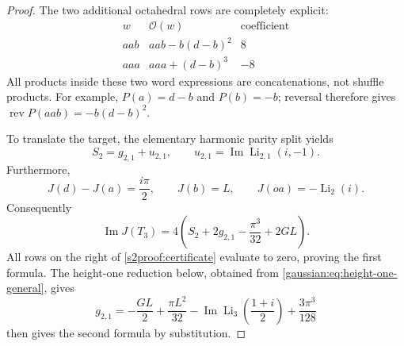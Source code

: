 \begin{proof}
The two additional octahedral rows are completely explicit:
\[
\begin{array}{c|l|r}
w&\mathcal O(w)&\text{coefficient}\\ \hline
aab&aab-b(d-b)^2&8\\
aaa&aaa+(d-b)^3&-8
\end{array}
\]
All products inside these two word expressions are concatenations,
not shuffle products.  For example, $P(a)=d-b$ and $P(b)=-b$;
reversal therefore gives
$\operatorname{rev}P(aab)=-b(d-b)^2$.

To translate the target, the elementary harmonic parity split yields
\[
 S_2=g_{2,1}+u_{2,1},\qquad
 u_{2,1}=\operatorname{Im}\operatorname{Li}_{2,1}(i,-1).
\]
Furthermore,
\[
 J(d)-J(a)=\frac{i\pi}{2},\qquad J(b)=L,\qquad
 J(oa)=-\operatorname{Li}_2(i).
\]
Consequently
\[
 \operatorname{Im}J(T_3)
 =4\left(S_2+2g_{2,1}-\frac{\pi^3}{32}+2GL\right).
\]
All rows on the right of \eqref{s2proof:certificate} evaluate to zero,
proving the first formula.  The height-one reduction below, obtained from
\eqref{gaussian:eq:height-one-general}, gives
\[
 g_{2,1}=-\frac{GL}{2}+\frac{\pi L^2}{32}
 -\operatorname{Im}\operatorname{Li}_3\!\left(\frac{1+i}{2}\right)
 +\frac{3\pi^3}{128}
\]
then gives the second formula by substitution.
\end{proof}
